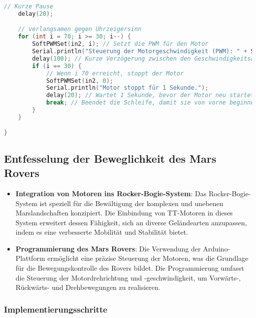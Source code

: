 \documentclass{vorlage-design-main}
\begin{document}
\begin{lstlisting}[language={C++}]
    // Kurze Pause
    delay(20);

    // verlangsamen gegen Uhrzeigersinn
    for (int i = 70; i >= 30; i--) {
        SoftPWMSet(in2, i); // Setzt die PWM für den Motor
        Serial.println("Steuerung der Motorgeschwindigkeit (PWM): " + String(i));
        delay(100); // Kurze Verzögerung zwischen den Geschwindigkeitsänderungen
        if (i == 30) {
            // Wenn i 70 erreicht, stoppt der Motor
            SoftPWMSet(in2, 0);
            Serial.println("Motor stoppt für 1 Sekunde.");
            delay(20); // Wartet 1 Sekunde, bevor der Motor neu startet
            break; // Beendet die Schleife, damit sie von vorne beginnen kann
        }
    }

}
\end{lstlisting}

\hypertarget{entfesselung-der-beweglichkeit-des-mars-rovers}{%
\subsection{Entfesselung der Beweglichkeit des Mars
Rovers}\label{entfesselung-der-beweglichkeit-des-mars-rovers}}

\begin{itemize}

\item
  \textbf{Integration von Motoren ins Rocker-Bogie-System}: Das
  Rocker-Bogie-System ist speziell für die Bewältigung der komplexen und
  unebenen Marslandschaften konzipiert. Die Einbindung von TT-Motoren in
  dieses System erweitert dessen Fähigkeit, sich an diverse Geländearten
  anzupassen, indem es eine verbesserte Mobilität und Stabilität bietet.
\item
  \textbf{Programmierung des Mars Rovers}: Die Verwendung der
  Arduino-Plattform ermöglicht eine präzise Steuerung der Motoren, was
  die Grundlage für die Bewegungskontrolle des Rovers bildet. Die
  Programmierung umfasst die Steuerung der Motordrehrichtung und
  -geschwindigkeit, um Vorwärts-, Rückwärts- und Drehbewegungen zu
  realisieren.
\end{itemize}

\hypertarget{implementierungsschritte}{%
\subsubsection{Implementierungsschritte}\label{implementierungsschritte}}
\end{document}
